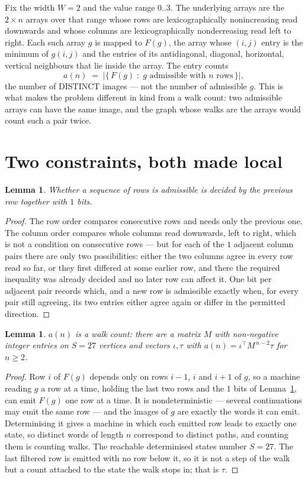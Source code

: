 \documentclass[11pt,a4paper]{article}
\theoremstyle{plain}
\newtheorem{lemma}[theorem]{Lemma}
\theoremstyle{definition}
\begin{document}
Fix the width $W=2$ and the value range $0..3$. The underlying arrays are the
$2\times n$ arrays over that range whose rows are lexicographically nonincreasing read downwards
and whose columns are lexicographically nondecreasing read left to right. Each such array $g$
is mapped to $F(g)$, the array whose $(i,j)$ entry is the minimum of $g(i,j)$ and the entries
of its antidiagonal, diagonal, horizontal, vertical neighbours that lie inside the array. The entry counts
\[
a(n)\;=\;\bigl|\{\,F(g)\;:\;g\text{ admissible with }n\text{ rows}\,\}\bigr|,
\]
the number of DISTINCT images --- not the number of admissible $g$. This is what makes the
problem different in kind from a walk count: two admissible arrays can have the same image, and
the graph whose walks are the arrays would count such a pair twice.

\section{Two constraints, both made local}

\begin{lemma}\label{lem:local}
Whether a sequence of rows is admissible is decided by the previous row together with
$1$ bits.
\end{lemma}

\begin{proof}
The row order compares consecutive rows and needs only the previous one. The column order
compares whole columns read downwards, left to right, which is not a condition on consecutive
rows --- but for each of the $1$ adjacent column pairs there are only two possibilities:
either the two columns agree in every row read so far, or they first differed at some earlier
row, and there the required inequality was already decided and no later row can affect it. One
bit per adjacent pair records which, and a new row is admissible exactly when, for every pair
still agreeing, its two entries either agree again or differ in the permitted direction.
\end{proof}

\begin{lemma}\label{lem:det}
$a(n)$ is a walk count: there are a matrix $M$ with non-negative integer entries on $S=27$
vertices and vectors $\iota,\tau$ with $a(n)=\iota^{\!\top}M^{\,n-2}\tau$ for $n\ge2$.
\end{lemma}

\begin{proof}
Row $i$ of $F(g)$ depends only on rows $i-1$, $i$ and $i+1$ of $g$, so a machine reading $g$ a
row at a time, holding the last two rows and the $1$ bits of Lemma~\ref{lem:local}, can
emit $F(g)$ one row at a time. It is nondeterministic --- several continuations may emit the
same row --- and the images of $g$ are exactly the words it can emit. Determinising it gives a
machine in which each emitted row leads to exactly one state, so distinct words of length $n$
correspond to distinct paths, and counting them is counting walks. The reachable determinised
states number $S=27$. The last filtered row is emitted with no row below it, so it is not a
step of the walk but a count attached to the state the walk stops in; that is $\tau$.
\end{proof}
\end{document}
